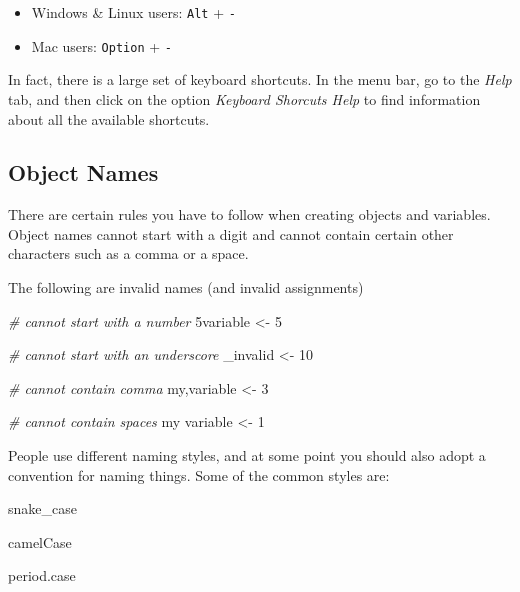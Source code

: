 \documentclass[
]{book}
\newenvironment{Shaded}{\begin{snugshade}}{\end{snugshade}}
\newcommand{\CommentTok}[1]{\textcolor[rgb]{0.56,0.35,0.01}{\textit{#1}}}
\newcommand{\DecValTok}[1]{\textcolor[rgb]{0.00,0.00,0.81}{#1}}
\newcommand{\NormalTok}[1]{#1}
\newcommand{\OtherTok}[1]{\textcolor[rgb]{0.56,0.35,0.01}{#1}}
\begin{document}
\begin{itemize}
\item
  Windows \& Linux users: \texttt{Alt} + \texttt{-}
\item
  Mac users: \texttt{Option} + \texttt{-}
\end{itemize}

In fact, there is a large set of keyboard shortcuts. In the menu bar, go to the
\emph{Help} tab, and then click on the option \emph{Keyboard Shorcuts Help} to find
information about all the available shortcuts.

\hypertarget{object-names}{%
\subsection{Object Names}\label{object-names}}

There are certain rules you have to follow when creating objects and variables.
Object names cannot start with a digit and cannot contain certain other characters
such as a comma or a space.

The following are invalid names (and invalid assignments)

\begin{Shaded}
\begin{Highlighting}[]
\CommentTok{\# cannot start with a number}
\NormalTok{5variable }\OtherTok{\textless{}{-}} \DecValTok{5}

\CommentTok{\# cannot start with an underscore}
\NormalTok{\_invalid }\OtherTok{\textless{}{-}} \DecValTok{10}

\CommentTok{\# cannot contain comma}
\NormalTok{my,variable }\OtherTok{\textless{}{-}} \DecValTok{3}

\CommentTok{\# cannot contain spaces}
\NormalTok{my variable }\OtherTok{\textless{}{-}} \DecValTok{1}
\end{Highlighting}
\end{Shaded}

People use different naming styles, and at some point you should also adopt a
convention for naming things. Some of the common styles are:

\begin{Shaded}
\begin{Highlighting}[]
\NormalTok{snake\_case}

\NormalTok{camelCase}

\NormalTok{period.case}
\end{Highlighting}
\end{Shaded}
\end{document}
